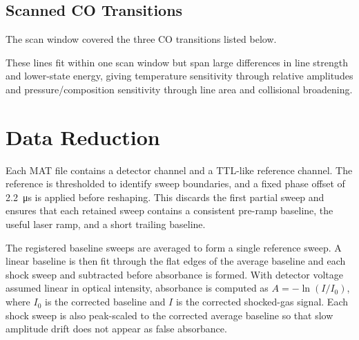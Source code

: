 \documentclass[12pt,letterpaper]{article}
\begin{document}
\subsection*{Scanned CO Transitions}

The scan window covered the three CO transitions listed below.

\begin{table}[h]
  \centering
  \footnotesize
  \setlength{\tabcolsep}{5pt}
  \caption{Spectroscopic parameters for the scanned CO transitions.}
  \label{tab:co-transitions}
\end{table}

These lines fit within one scan window but span large differences in line strength and lower-state energy, giving temperature sensitivity through relative amplitudes and pressure/composition sensitivity through line area and collisional broadening.

\section{Data Reduction}

Each MAT file contains a detector channel and a TTL-like reference channel. The reference is thresholded to identify sweep boundaries, and a fixed phase offset of \SI{2.2}{\micro\second} is applied before reshaping. This discards the first partial sweep and ensures that each retained sweep contains a consistent pre-ramp baseline, the useful laser ramp, and a short trailing baseline.

The registered baseline sweeps are averaged to form a single reference sweep. A linear baseline is then fit through the flat edges of the average baseline and each shock sweep and subtracted before absorbance is formed. With detector voltage assumed linear in optical intensity, absorbance is computed as $A=-\ln(I/I_0)$, where $I_0$ is the corrected baseline and $I$ is the corrected shocked-gas signal. Each shock sweep is also peak-scaled to the corrected average baseline so that slow amplitude drift does not appear as false absorbance.
\end{document}
